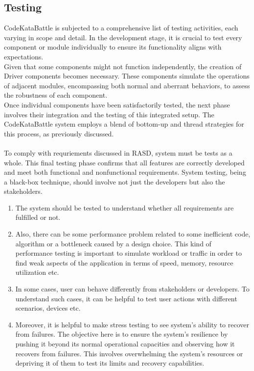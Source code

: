 \subsection{Testing}
\indent CodeKataBattle is subjected to a comprehensive list of testing activities, each varying in scope and detail. In the development stage, it is crucial to test every component or module individually to ensure its functionality aligns with expectations. 
\\
\indent Given that some components might not function independently, the creation of Driver components becomes necessary. These components simulate the operations of adjacent modules, encompassing both normal and aberrant behaviors, to assess the robustness of each component.
\\
\indent Once individual components have been satisfactorily tested, the next phase involves their integration and the testing of this integrated setup. The CodeKataBattle system employs a blend of bottom-up and thread strategies for this process, as previously discussed. 
\\
\\ To comply with requriements discussed in RASD, system must be tests as a whole. This final testing phase confirms that all features are correctly developed and meet both functional and nonfunctional requirements. System testing, being a black-box technique, should involve not just the developers but also the stakeholders.

\begin{enumerate}
    \item The system should be tested to understand whether all requirements are fulfilled or not. 
    \item Also, there can be some performance problem related to some inefficient code, algorithm or a bottleneck caused by a design choice. This kind of performance testing is important to simulate workload or traffic in order to find weak aspects of the application in terms of speed, memory, resource utilization etc.
    \item In some cases, user can behave differently from stakeholders or developers. To understand such cases, it can be helpful to test user actions with different scenarios, devices etc. 
    \item Moreover, it is helpful to make stress testing to see system's ability to recover from failures. The objective here is to ensure the system's resilience by pushing it beyond its normal operational capacities and observing how it recovers from failures. This involves overwhelming the system's resources or depriving it of them to test its limits and recovery capabilities.
\end{enumerate}

